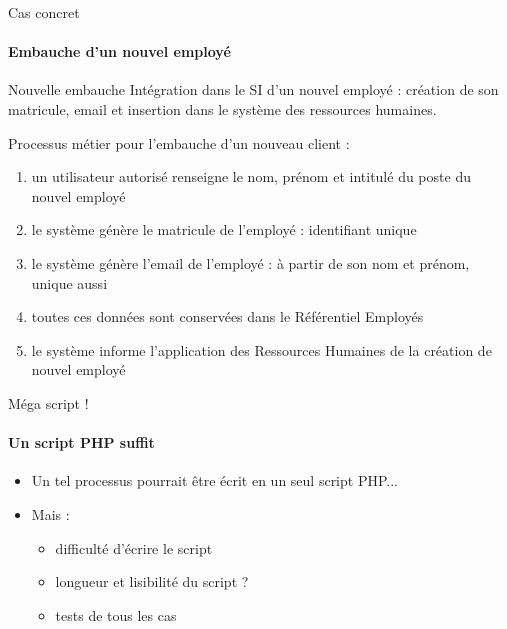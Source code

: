 \documentclass[compress]{beamer}%
\begin{document}
\begin{frame}{Cas concret}
	\framesubtitle{Embauche d'un nouvel employé}
	
	\begin{exampleblock}{Nouvelle embauche}
	Intégration dans le SI d'un nouvel employé : création de son matricule, email et insertion dans le système des ressources humaines.
	\end{exampleblock}
	
	\pause
	Processus métier pour l'embauche d'un nouveau client :
	\begin{enumerate}[<+->]
		\item un utilisateur autorisé renseigne le nom, prénom et intitulé du poste du nouvel employé
		\item le système génère le matricule de l'employé : identifiant unique
		\item le système génère l'email de l'employé : à partir de son nom et prénom, unique aussi
		\item toutes ces données sont conservées dans le Référentiel Employés
		\item le système informe l'application des Ressources Humaines de la création de nouvel employé
	\end{enumerate}	
	
\end{frame}

\begin{frame}{Méga script !}
	\framesubtitle{Un script PHP suffit}
	
	\begin{itemize}[<+->]
	\item Un tel processus pourrait être écrit en un seul script PHP...\\
	\item Mais :
	\begin{itemize}[<+->]
	\item difficulté d'écrire le script
	\item longueur et lisibilité du script ?
	\item tests de tous les cas
	\end{itemize}
	\end{itemize}
	
\end{frame}
\end{document}
